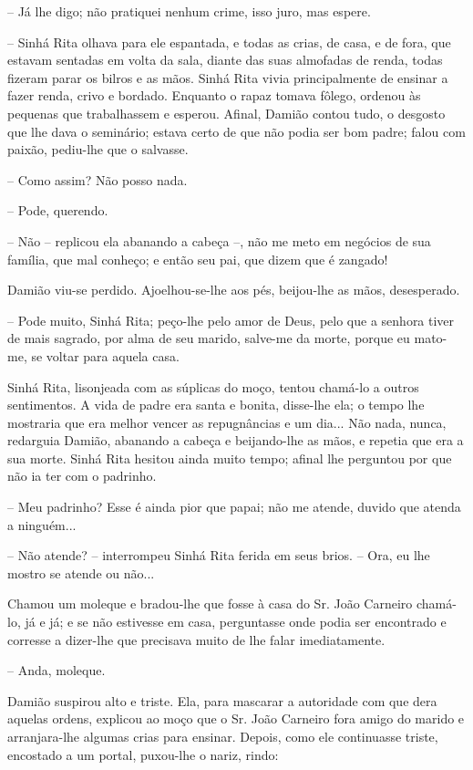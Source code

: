 -- Já lhe digo; não pratiquei nenhum crime, isso juro, mas espere.

-- Sinhá Rita olhava para ele espantada, e todas as crias, de casa, e de
fora, que estavam sentadas em volta da sala, diante das suas almofadas
de renda, todas fizeram parar os bilros e as mãos. Sinhá Rita vivia
principalmente de ensinar a fazer renda, crivo e bordado. Enquanto o
rapaz tomava fôlego, ordenou às pequenas que trabalhassem e esperou.
Afinal, Damião contou tudo, o desgosto que lhe dava o seminário; estava
certo de que não podia ser bom padre; falou com paixão, pediu-lhe que o
salvasse.

-- Como assim? Não posso nada.

-- Pode, querendo.

-- Não -- replicou ela abanando a cabeça --, não me meto em negócios de
sua família, que mal conheço; e então seu pai, que dizem que é zangado!

Damião viu-se perdido. Ajoelhou-se-lhe aos pés, beijou-lhe as mãos,
desesperado.

-- Pode muito, Sinhá Rita; peço-lhe pelo amor de Deus, pelo que a
senhora tiver de mais sagrado, por alma de seu marido, salve-me da
morte, porque eu mato-me, se voltar para aquela casa.

Sinhá Rita, lisonjeada com as súplicas do moço, tentou chamá-lo a outros
sentimentos. A vida de padre era santa e bonita, disse-lhe ela; o tempo
lhe mostraria que era melhor vencer as repugnâncias e um dia... Não
nada, nunca, redarguia Damião, abanando a cabeça e beijando-lhe as mãos,
e repetia que era a sua morte. Sinhá Rita hesitou ainda muito tempo;
afinal lhe perguntou por que não ia ter com o padrinho.

-- Meu padrinho? Esse é ainda pior que papai; não me atende, duvido que
atenda a ninguém...

-- Não atende? -- interrompeu Sinhá Rita ferida em seus brios. -- Ora,
eu lhe mostro se atende ou não...

Chamou um moleque e bradou-lhe que fosse à casa do Sr. João Carneiro
chamá-lo, já e já; e se não estivesse em casa, perguntasse onde podia
ser encontrado e corresse a dizer-lhe que precisava muito de lhe falar
imediatamente.

-- Anda, moleque.

Damião suspirou alto e triste. Ela, para mascarar a autoridade com que
dera aquelas ordens, explicou ao moço que o Sr. João Carneiro fora amigo
do marido e arranjara-lhe algumas crias para ensinar. Depois, como ele
continuasse triste, encostado a um portal, puxou-lhe o nariz, rindo:

